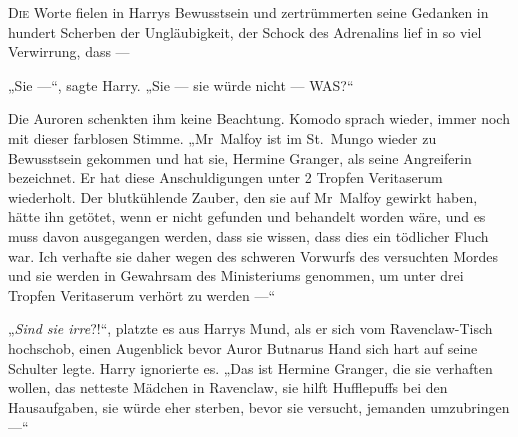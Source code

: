 
\lettrine{D}{ie} Worte fielen in Harrys Bewusstsein und zertrümmerten seine Gedanken in hundert Scherben der Ungläubigkeit, der Schock des Adrenalins lief in so viel Verwirrung, dass —

„Sie —“, sagte Harry.
„Sie — sie würde nicht — WAS?“

Die Auroren schenkten ihm keine Beachtung. Komodo sprach wieder, immer noch mit dieser farblosen Stimme.
„Mr~Malfoy ist im St.~Mungo wieder zu Bewusstsein gekommen und hat sie, Hermine Granger, als seine Angreiferin bezeichnet. Er hat diese Anschuldigungen unter 2 Tropfen Veritaserum wiederholt. Der blutkühlende Zauber, den sie auf Mr~Malfoy gewirkt haben, hätte ihn getötet, wenn er nicht gefunden und behandelt worden wäre, und es muss davon ausgegangen werden, dass sie wissen, dass dies ein tödlicher Fluch war. Ich verhafte sie daher wegen des schweren Vorwurfs des versuchten Mordes und sie werden in Gewahrsam des Ministeriums genommen, um unter drei Tropfen Veritaserum verhört zu werden —“

„\emph{Sind sie irre}?!“, platzte es aus Harrys Mund, als er sich vom Ravenclaw-Tisch hochschob, einen Augenblick bevor Auror Butnarus Hand sich hart auf seine Schulter legte. Harry ignorierte es.
„Das ist Hermine Granger, die sie verhaften wollen, das netteste Mädchen in Ravenclaw, sie hilft Hufflepuffs bei den Hausaufgaben, sie würde eher sterben, bevor sie versucht, jemanden umzubringen —“


